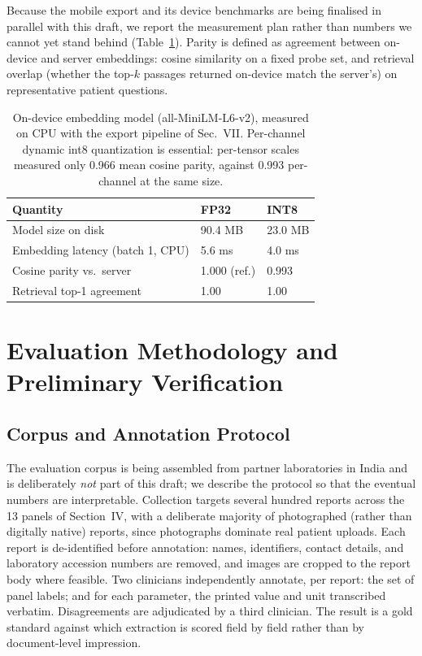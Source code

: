 \documentclass[conference]{IEEEtran}
\begin{document}
Because the mobile export and its device benchmarks are being finalised
in parallel with this draft, we report the measurement plan rather than
numbers we cannot yet stand behind (Table~\ref{tab:ondevice}). Parity
is defined as agreement between on-device and server embeddings:
cosine similarity on a fixed probe set, and retrieval overlap (whether
the top-$k$ passages returned on-device match the server's) on
representative patient questions.

\begin{table}[t]
\centering
\small
\caption{On-device embedding model (all-MiniLM-L6-v2), measured on CPU
with the export pipeline of Sec.~VII. Per-channel dynamic int8
quantization is essential: per-tensor scales measured only 0.966 mean
cosine parity, against 0.993 per-channel at the same size.}
\label{tab:ondevice}
\begin{tabular}{@{}lll@{}}
\toprule
\textbf{Quantity} & \textbf{FP32} & \textbf{INT8} \\
\midrule
Model size on disk        & 90.4 MB & 23.0 MB \\
Embedding latency (batch 1, CPU) & 5.6 ms & 4.0 ms \\
Cosine parity vs.\ server  & 1.000 (ref.) & 0.993 \\
Retrieval top-1 agreement  & 1.00 & 1.00 \\
\bottomrule
\end{tabular}
\end{table}

\section{Evaluation Methodology and Preliminary Verification}

\subsection{Corpus and Annotation Protocol}
The evaluation corpus is being assembled from partner laboratories in
India and is deliberately \emph{not} part of this draft; we describe
the protocol so that the eventual numbers are interpretable.
Collection targets several hundred reports across the 13 panels of
Section~IV, with a deliberate majority of photographed (rather than
digitally native) reports, since photographs dominate real patient
uploads. Each report is de-identified before annotation: names,
identifiers, contact details, and laboratory accession numbers are
removed, and images are cropped to the report body where feasible.
Two clinicians independently annotate, per report: the set of panel
labels; and for each parameter, the printed value and unit transcribed
verbatim. Disagreements are adjudicated by a third clinician. The
result is a gold standard against which extraction is scored field by
field rather than by document-level impression.
\end{document}
